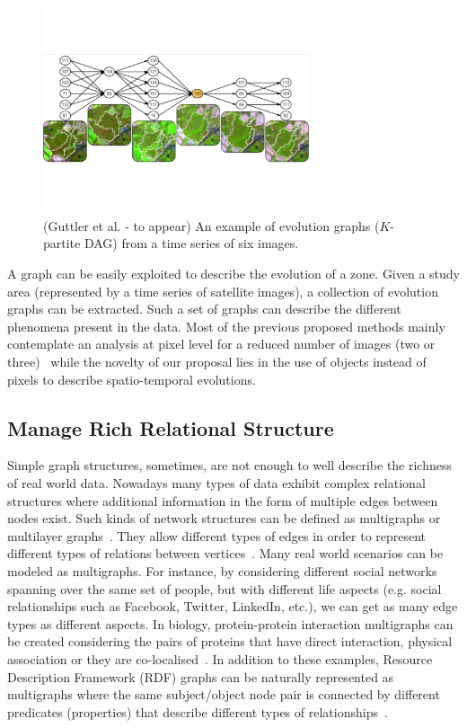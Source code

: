  

\begin{figure}[!ht]
\begin{center}
	\includegraphics[width=0.70\textwidth]{Figures/evolution_graph.pdf}
\end{center}
\caption{\label{evol_graph} (Guttler et al. - to appear) An example of evolution graphs ($K$-partite DAG) from a time series of six images.}
\end{figure}


A graph can be easily exploited to describe the evolution of a zone. Given a study area (represented by a time series of satellite images), a collection of evolution graphs can be extracted. Such a set of graphs can describe the different phenomena present in the data.
Most of the previous proposed methods mainly contemplate an analysis at pixel level for a reduced number of images (two or three)~\cite{Hussaina13} while the novelty of our proposal lies in the use of objects instead of pixels to describe spatio-temporal evolutions.


\subsection{Manage Rich Relational Structure}
Simple graph structures, sometimes, are not enough to well describe the richness of real world data.
Nowadays many types of data exhibit complex relational structures where additional information in the form of multiple edges between nodes exist. Such kinds of network structures can be defined as multigraphs or multilayer graphs~\cite{PapalexakisAI13, RedondoSIZP15, Ingalalli16, Bourqui16}. They allow different types of edges in order to represent different types of relations between vertices~\cite{BodenGHS12,TangWL12,BonchiGGU14,JinHWRX10}.
Many real world scenarios can be modeled as multigraphs. For instance, by considering different social networks spanning over the same set of people, but with different life aspects (e.g. social relationships such as Facebook, Twitter, LinkedIn, etc.), we can get as many edge types as different aspects. In biology, protein-protein interaction multigraphs can be created considering the pairs of proteins that have direct interaction, physical association or they are co-localised~\cite{BonchiGGU14}. In addition to these examples, Resource Description Framework (RDF) graphs can be naturally represented as multigraphs where the same subject/object node pair is connected by different predicates (properties) that describe different types of relationships~\cite{LibkinRV13}.

